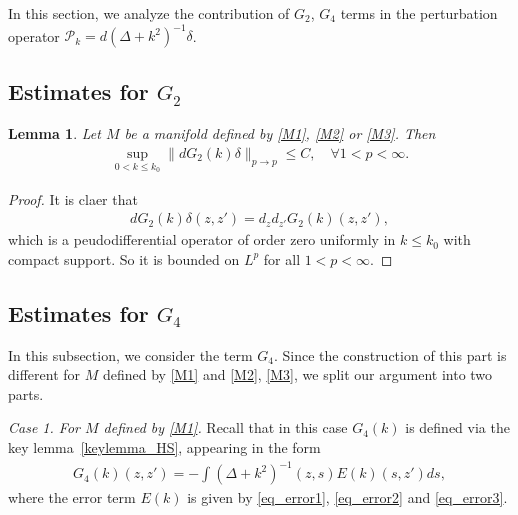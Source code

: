 \documentclass[12pt]{amsart}
\newtheorem{lemma}[theorem]{Lemma}
\begin{document}
In this section, we analyze the contribution of $G_2$, $G_4$ terms in the perturbation operator $\mathcal{P}_k = d(\Delta+k^2)^{-1} \delta$. 

\subsection{Estimates for $G_2$}

\begin{lemma}\label{lemma_G2}
Let $M$ be a manifold defined by \eqref{M1}, \eqref{M2} or \eqref{M3}. Then
\begin{align*}
    \sup_{0<k\le k_0}\|dG_2(k)\delta\|_{p\to p} \le C,\quad \forall 1< p<  \infty.
\end{align*}
\end{lemma}

\begin{proof}
It is claer that
\begin{align*}
dG_2(k)\delta(z,z') = d_z d_{z'} G_2(k)(z,z'),       
\end{align*}
which is a peudodifferential operator of order zero uniformly in $k\le k_0$ with compact support. So it is bounded on $L^p$ for all $1<p<\infty$.


\end{proof}






\subsection{Estimates for $G_4$}
In this subsection, we consider the term $G_4$. Since the construction of this part is different for $M$ defined by \eqref{M1} and \eqref{M2}, \eqref{M3}, we split our argument into two parts.

\textit{Case 1. For $M$ defined by \eqref{M1}.} Recall that in this case $G_4(k)$ is defined via the key lemma~\ref{keylemma_HS}, appearing in the form
\begin{align}
    G_4(k)(z,z') = - \int (\Delta + k^2)^{-1}(z,s) E(k)(s,z') ds,
\end{align}
where the error term $E(k)$ is given by \eqref{eq_error1}, \eqref{eq_error2} and \eqref{eq_error3}.
\end{document}
